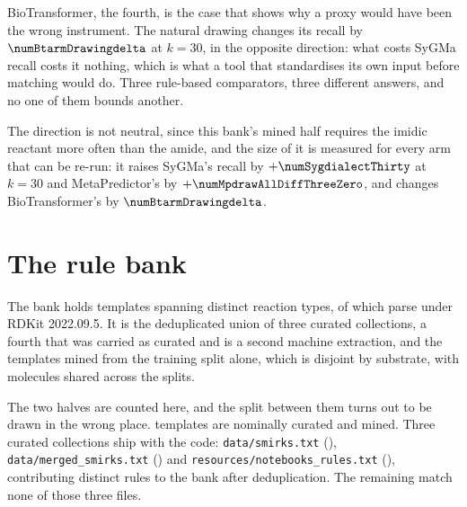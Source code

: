 \documentclass[journal=jcisd8,manuscript=suppinfo,layout=onecolumn]{achemso}
\begin{document}
BioTransformer, the fourth, is the case that shows why a proxy would have been the wrong
instrument. The natural drawing changes its recall by $\numBtarmDrawingdelta$ at $k=30$, in the
opposite direction: what costs SyGMa recall costs it nothing, which is what a tool that
standardises its own input before matching would do. Three rule-based comparators, three
different answers, and no one of them bounds another.


The direction is not
neutral, since this bank's mined half requires the imidic reactant more often than the amide, and
the size of it is measured for every arm that can be re-run: it raises SyGMa's recall by
$+\numSygdialectThirty$ at $k=30$ and MetaPredictor's by $+\numMpdrawAllDiffThreeZero$, and changes
BioTransformer's by $\numBtarmDrawingdelta$.
\section{The rule bank}
\label{sec:si-bank}

The bank holds \numBankRules{} templates spanning \numBankTypes{} distinct reaction types, of
which \numBankParses{} parse under RDKit 2022.09.5. It is the deduplicated union of three curated
collections, a fourth that was carried as curated and is a second machine extraction, and the
templates mined from the training split alone, which is disjoint by substrate, with molecules
shared across the splits.

The two halves are counted here, and the split between them turns out to be
drawn in the wrong place. \numCuratedTotal{} templates are nominally curated and
\numMinedRules{} mined. Three curated collections ship with the code:
\texttt{data/smirks.txt} (\numCuratedHydroxylation{}), \texttt{data/merged\_smirks.txt}
(\numCuratedMerged{}) and \texttt{resources/notebooks\_rules.txt}
(\numCuratedNotebooks{}), contributing \numAttribNamed{} distinct rules to the bank after
deduplication. The remaining \numAttribUnattributed{} match none of those three files.
\end{document}
